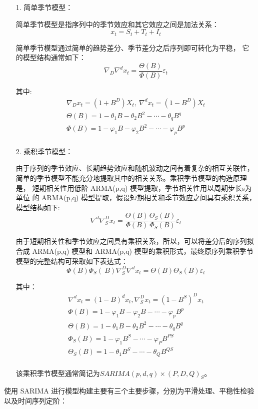 \documentclass[AutoFakeBold]{LZUThesis}
\begin{document}
\begin{itemize}
\item[1. ] 简单季节模型：

简单季节模型是指序列中的季节效应和其它效应之间是加法关系：
$$x_t=S_t+T_t+I_t$$

简单季节模型通过简单的趋势差分、季节差分之后序列即可转化为平稳，
它的模型结构通常如下：
$$\nabla_D\nabla^dx_t=\frac{\Theta(B)}{\Phi(B)}\varepsilon_t$$

其中:
$$
\begin{matrix}
\nabla_Dx_t=\left(1+B^D\right)X_t,{\ }\nabla^dx_t=\left(1-B^D\right)X_t\\
\Theta(B)=1-\theta_1B-\theta_2B^2-\cdots-\theta_qB^q\\
\Phi(B)=1-\varphi_1B-\varphi_2B^2-\cdots-\varphi_pB^p\\
\end{matrix}
$$

\item[2. ] 乘积季节模型：

由于序列的季节效应、长期趋势效应和随机波动之间有着复杂的相互关联性，
简单的季节模型不能充分地提取其中的相关关系。乘积季节模型的构造原理是，
短期相关性用低阶 ARMA(p,q) 模型提取，季节相关性用以周期步长s为单位
的 ARMA(p,q) 模型提取，假设短期相关和季节效应之间具有乘积关系，
模型结构如下:
$$\nabla^d\nabla_S^Dx_t=\frac{\Theta(B)}{\Phi(B)}\frac{\Theta_S(B)}{\Phi_S(B)}\varepsilon_t$$

由于短期相关性和季节效应之间具有乘积关系，所以，可以将差分后的序列拟合成 ARMA(p,q) 模型和 ARMA(p,q) 
模型的乘积形式，最终原序列乘积季节模型的完整结构可采取如下表达式：
$$\Phi(B)\Phi_S(\mathrm{\ }B)\nabla_S^D\nabla^dx_t=\Theta(B)\Theta_S(B)\varepsilon_t$$

其中：
$$
\begin{matrix}
\nabla^dx_t=(1-B)^dx_t,\nabla_S^Dx_t=\left(1-B^S\right)^Dx_t\\
\Phi(B)=1-\varphi_1B-\varphi_2B-\cdots-\varphi_pB^p\\
\Theta(B)=1-\theta_1B-\theta_2B^2-\cdots-\theta_qB^q\\
\Phi_S(B)=1-\varphi_1B^S-\cdots-\varphi_PB^{PS}\\
\Theta_S(B)=1-\theta_1B^S-\cdots-\theta_QB^{QS}\\
\end{matrix}
$$

该乘积季节模型通常简记为$SARIMA(p,d,q)\times(P,D,Q)_S$。
\end{itemize}

使用 SARIMA 进行模型构建主要有三个主要步骤，分别为平滑处理、平稳性检验
以及时间序列定阶\cite{Foneone2019时间序列}：
\end{document}
